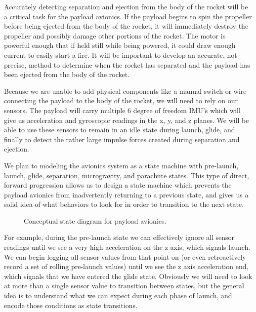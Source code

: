 \documentclass[onecolumn, draftclsnofoot, 10pt, compsoc]{IEEEtran}
\begin{document}
Accurately detecting separation and ejection from the body of the rocket will be a critical task for the payload avionics.  If the payload begins to spin the propeller before being ejected from the body of the rocket, it will immediately destroy the propeller and possibly damage other portions of the rocket.  The motor is powerful enough that if held still while being powered, it could draw enough current to easily start a fire.  It will be important to develop an accurate, not precise, method to determine when the rocket has separated and the payload has been ejected from the body of the rocket.

Because we are unable to add physical components like a manual switch or wire connecting the payload to the body of the rocket, we will need to rely on our sensors.  The payload will carry multiple 6 degree of freedom IMU's which will give us acceleration and gyroscopic readings in the x, y, and z planes.  We will be able to use these sensors to remain in an idle state during launch, glide, and finally to detect the rather large impulse forces created during separation and ejection.

We plan to modeling the avionics system as a state machine with pre-launch, launch, glide, separation, microgravity, and parachute states.  This type of direct, forward progression allows us to design a state machine which prevents the payload avionics from inadvertently returning to a previous state, and gives us a solid idea of what behaviors to look for in order to transition to the next state.

\begin{figure}[!ht]
  \centering
  \caption{Conceptual state diagram for payload avionics.}
\end{figure}

For example, during the pre-launch state we can effectively ignore all sensor readings until we see a very high acceleration on the z axis, which signals launch.  We can begin logging all sensor values from that point on (or even retroactively record a set of rolling pre-launch values) until we see the z axis acceleration end, which signals that we have entered the glide state.  Obviously we will need to look at more than a single sensor value to transition between states, but the general idea is to understand what we can expect during each phase of launch, and encode those conditions as state transitions.
\end{document}

